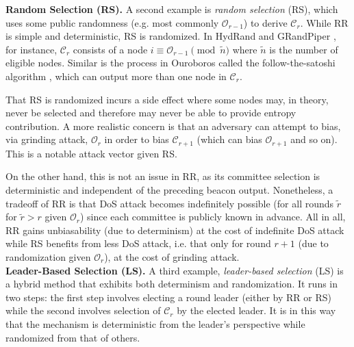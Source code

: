 \documentclass[conference]{IEEEtran}
\theoremstyle{definition}
\theoremstyle{remark}
\begin{document}
\noindent\textbf{Random Selection (RS).} A second example is \textit{random selection} (RS), which uses some public randomness (e.g. most commonly $\mathcal{O}_{r - 1}$) to derive $\mathcal{C}_r$. While RR is simple and deterministic, RS is randomized. In HydRand \cite{schindler2020hydrand} and GRandPiper \cite{bhat2020randpiper}, for instance, $\mathcal{C}_r$ consists of a node $i \equiv \mathcal{O}_{r - 1} \pmod{\tilde{n}}$ where $\tilde{n}$ is the number of eligible nodes. Similar is the process in Ouroboros \cite{kiayias2017ouroboros} called the follow-the-satoshi algorithm \cite{bentov2014proof,kiayias2017ouroboros}, which can output more than one node in $\mathcal{C}_r$.

That RS is randomized incurs a side effect where some nodes may, in theory, never be selected and therefore may never be able to provide entropy contribution. A more realistic concern is that an adversary can attempt to bias, via grinding attack, $\mathcal{O}_r$ in order to bias $\mathcal{C}_{r + 1}$ (which can bias $\mathcal{O}_{r + 1}$ and so on). This is a notable attack vector given RS.

On the other hand, this is not an issue in RR, as its committee selection is deterministic and independent of the preceding beacon output. Nonetheless, a tradeoff of RR is that DoS attack becomes indefinitely possible (for all rounds $\tilde{r}$ for $\tilde{r} > r$ given $\mathcal{O}_r$) since each committee is publicly known in advance. All in all, RR gains unbiasability (due to determinism) at the cost of indefinite DoS attack while RS benefits from less DoS attack, i.e. that only for round $r + 1$ (due to randomization given $\mathcal{O}_r$), at the cost of grinding attack.\\

\noindent\textbf{Leader-Based Selection (LS).} A third example, \textit{leader-based selection} (LS) is a hybrid method that exhibits both determinism and randomization. It runs in two steps: the first step involves electing a round leader (either by RR or RS) while the second involves selection of $\mathcal{C}_r$ by the elected leader. It is in this way that the mechanism is deterministic from the leader's perspective while randomized from that of others.
\end{document}
